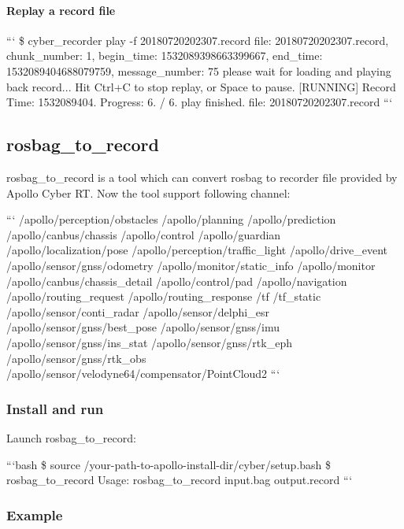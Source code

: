 \paragraph*{Replay a record file}

``` \$ cyber\-\_\-recorder play -\/f 20180720202307.\-record file\-: 20180720202307.\-record, chunk\-\_\-number\-: 1, begin\-\_\-time\-: 1532089398663399667, end\-\_\-time\-: 1532089404688079759, message\-\_\-number\-: 75 please wait for loading and playing back record... Hit Ctrl+\-C to stop replay, or Space to pause. \mbox{[}R\-U\-N\-N\-I\-N\-G\mbox{]} Record Time\-: 1532089404. Progress\-: 6. / 6. play finished. file\-: 20180720202307.\-record ```

\subsection*{rosbag\-\_\-to\-\_\-record}

{\ttfamily rosbag\-\_\-to\-\_\-record} is a tool which can convert rosbag to recorder file provided by Apollo Cyber R\-T. Now the tool support following channel\-:

``` /apollo/perception/obstacles /apollo/planning /apollo/prediction /apollo/canbus/chassis /apollo/control /apollo/guardian /apollo/localization/pose /apollo/perception/traffic\-\_\-light /apollo/drive\-\_\-event /apollo/sensor/gnss/odometry /apollo/monitor/static\-\_\-info /apollo/monitor /apollo/canbus/chassis\-\_\-detail /apollo/control/pad /apollo/navigation /apollo/routing\-\_\-request /apollo/routing\-\_\-response /tf /tf\-\_\-static /apollo/sensor/conti\-\_\-radar /apollo/sensor/delphi\-\_\-esr /apollo/sensor/gnss/best\-\_\-pose /apollo/sensor/gnss/imu /apollo/sensor/gnss/ins\-\_\-stat /apollo/sensor/gnss/rtk\-\_\-eph /apollo/sensor/gnss/rtk\-\_\-obs /apollo/sensor/velodyne64/compensator/\-Point\-Cloud2 ```

\subsubsection*{Install and run}

Launch rosbag\-\_\-to\-\_\-record\-:

```bash \$ source /your-\/path-\/to-\/apollo-\/install-\/dir/cyber/setup.bash \$ rosbag\-\_\-to\-\_\-record Usage\-: rosbag\-\_\-to\-\_\-record input.\-bag output.\-record ```

\subsubsection*{Example}

